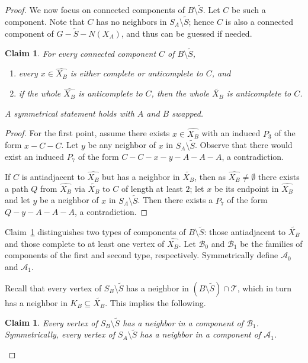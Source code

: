\documentclass[11pt,a4paper]{article}
\newtheorem{claim}[theorem]{Claim}
\theoremstyle{definition}
\def\T{\mathcal{T}}
\begin{document}
\begin{proof}
We now focus on connected components of $B \setminus \widetilde{S}$. 
Let $C$ be such a component. Note that $C$ has no neighbors in $S_A \setminus \widetilde{S}$;
hence $C$ is also a connected component of $G-\widetilde{S}-N(X_A)$, and thus can be guessed
if needed. 

\begin{claim}\label{cl:Bcomps}
For every connected component $C$ of $B \setminus \widetilde{S}$,
\begin{enumerate}
    \item every $x \in \widehat{X_B}$ is either complete or anticomplete to $C$, and
    \item if the whole $\widehat{X_B}$ is anticomplete to $C$, then 
    the whole $\widetilde{X_B}$ is anticomplete to $C$. 
\end{enumerate}
A symmetrical statement holds with $A$ and $B$ swapped.
\end{claim}
\begin{proof}
For the first point, assume there exists $x \in \widehat{X_B}$ with an induced $P_3$ of the form
$x-C-C$. Let $y$ be any neighbor of $x$ in
$S_A \setminus \widetilde{S}$. Observe that there would exist an induced $P_7$
of the form $C-C-x-y-A-A-A$, a contradiction. 

If $C$ is antiadjacent to $\widehat{X_B}$ but has a neighbor in $\widetilde{X_B}$,
then as $\widehat{X_B} \neq \emptyset$ there exists a path $Q$ from $\widehat{X_B}$ via $\widetilde{X_B}$ to $C$
of length at least $2$; let $x$ be its endpoint in $\widehat{X_B}$ and
let $y$ be a neighbor of $x$ in $S_A \setminus \widetilde{S}$.
Then there exists a $P_7$ of the form $Q-y-A-A-A$, a contradiction.
\end{proof}
Claim~\ref{cl:Bcomps} distinguishes two types of components of $B \setminus \widetilde{S}$:
those antiadjacent to $\widetilde{X_B}$
and those complete to at least one vertex of $\widehat{X_B}$. 
Let $\mathcal{B}_0$ and $\mathcal{B}_1$ be the families of components of the first
and second type, respectively. Symmetrically define $\mathcal{A}_0$ and $\mathcal{A}_1$. 

Recall that every vertex of $S_B \setminus \widetilde{S}$ has a neighbor in
$(B \setminus \widetilde{S}) \cap \T$, which in turn has a neighbor in $K_B \subseteq \widetilde{X_B}$. This implies the following.
\begin{claim}\label{cl:B1nei}
 Every vertex of $S_B \setminus \widetilde{S}$ has a neighbor in a component of $\mathcal{B}_1$. 
 Symmetrically, 
 every vertex of $S_A \setminus \widetilde{S}$ has a neighbor in a component of $\mathcal{A}_1$. 
\end{claim}


\end{proof}
\end{document}
